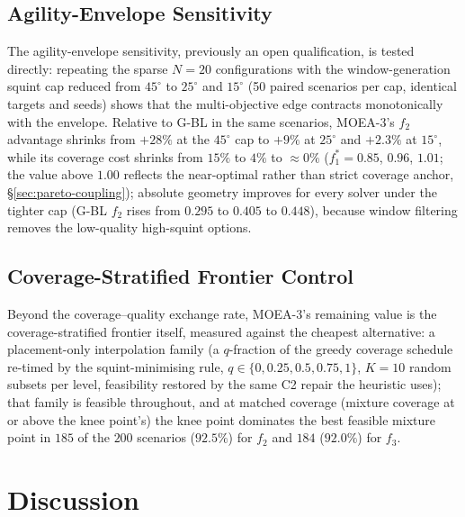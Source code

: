\documentclass[preprint,12pt,authoryear]{elsarticle}
\begin{document}
\subsection{Agility-Envelope Sensitivity}\label{sec:envelope-sensitivity}
The agility-envelope sensitivity, previously an open qualification, is
tested directly: repeating the sparse $N=20$ configurations with the
window-generation squint cap reduced from $45^\circ$ to $25^\circ$ and
$15^\circ$ (50 paired scenarios per cap, identical targets and seeds)
shows that the multi-objective edge contracts monotonically with the
envelope. Relative to G-BL in the same scenarios, MOEA-3's $f_2$
advantage shrinks from $+28\%$ at the $45^\circ$ cap to $+9\%$ at
$25^\circ$ and $+2.3\%$ at $15^\circ$, while its coverage cost shrinks
from $15\%$ to $4\%$ to $\approx 0\%$ ($f_1^* = 0.85$, $0.96$, $1.01$; the
value above $1.00$ reflects the near-optimal rather than strict coverage
anchor, \S\ref{sec:pareto-coupling});
absolute geometry improves for every solver under the tighter cap
(G-BL $f_2$ rises from $0.295$ to $0.405$ to $0.448$), because window
filtering removes the low-quality high-squint options.

\subsection{Coverage-Stratified Frontier Control}\label{sec:frontier-control}
Beyond the coverage--quality exchange rate, MOEA-3's remaining value is
the coverage-stratified frontier itself, measured against the cheapest
alternative: a placement-only
interpolation family (a $q$-fraction of the greedy coverage schedule
re-timed by the squint-minimising rule,
$q \in \{0, 0.25, 0.5, 0.75, 1\}$, $K=10$ random subsets per level,
feasibility restored by the same C2 repair the heuristic uses); that
family is feasible throughout, and at matched coverage (mixture coverage
at or above the knee point's) the knee point dominates the best feasible
mixture point in $185$ of the $200$ scenarios ($92.5\%$) for $f_2$ and
$184$ ($92.0\%$) for $f_3$.

\section{Discussion}
\end{document}
